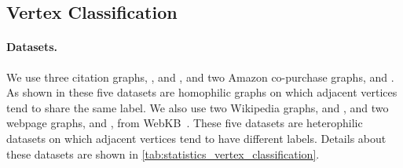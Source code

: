 \begin{table}[t]
\caption{Vertex classification results on heterophilic datasets.}
\label{tab:vertexclassificationhete}
\end{table}


\subsection{Vertex Classification}

\paragraph{Datasets.} 
We use three citation graphs, \cora{}, \citeseer{} and \pubmed{}, and two Amazon co-purchase graphs, \amazoncomputers{} and \amazonphoto{}. As shown in \citet{chien21} these five datasets are homophilic graphs on which adjacent vertices tend to share the same label. We also use two Wikipedia graphs, \chameleon{} and \squirrel{}, and two webpage graphs, \texas{} and \cornell{}, from WebKB~\citep{Pei2020}. These five datasets are heterophilic datasets on which adjacent vertices tend to have different labels.
Details about these datasets are shown in \cref{tab:statistics_vertex_classification}.




